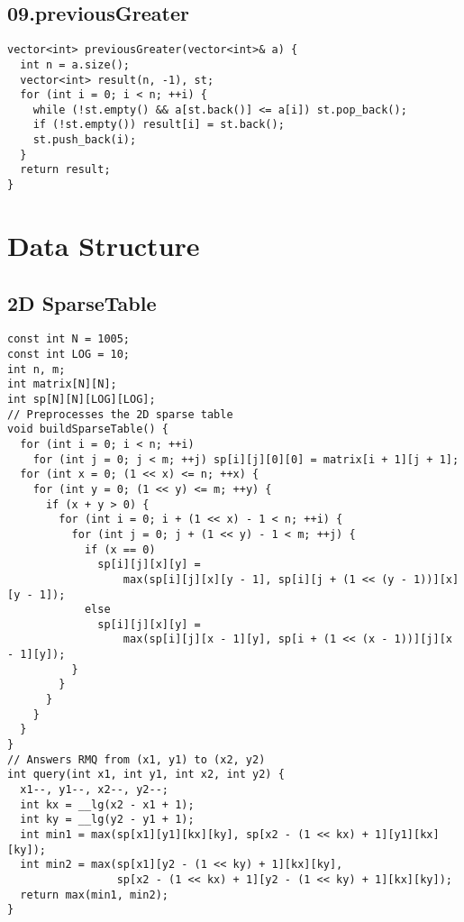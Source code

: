 \documentclass[twoside]{article}
\begin{document}
\begin{multicols*}{2}
{
\subsection*{09.previousGreater}
}
\begin{verbatim}
vector<int> previousGreater(vector<int>& a) {
  int n = a.size();
  vector<int> result(n, -1), st;
  for (int i = 0; i < n; ++i) {
    while (!st.empty() && a[st.back()] <= a[i]) st.pop_back();
    if (!st.empty()) result[i] = st.back();
    st.push_back(i);
  }
  return result;
}
\end{verbatim}

{
\section*{Data Structure}
}
{
\subsection*{2D SparseTable}
}
\begin{verbatim}
const int N = 1005;
const int LOG = 10;
int n, m;
int matrix[N][N];
int sp[N][N][LOG][LOG];
// Preprocesses the 2D sparse table
void buildSparseTable() {
  for (int i = 0; i < n; ++i)
    for (int j = 0; j < m; ++j) sp[i][j][0][0] = matrix[i + 1][j + 1];
  for (int x = 0; (1 << x) <= n; ++x) {
    for (int y = 0; (1 << y) <= m; ++y) {
      if (x + y > 0) {
        for (int i = 0; i + (1 << x) - 1 < n; ++i) {
          for (int j = 0; j + (1 << y) - 1 < m; ++j) {
            if (x == 0)
              sp[i][j][x][y] =
                  max(sp[i][j][x][y - 1], sp[i][j + (1 << (y - 1))][x][y - 1]);
            else
              sp[i][j][x][y] =
                  max(sp[i][j][x - 1][y], sp[i + (1 << (x - 1))][j][x - 1][y]);
          }
        }
      }
    }
  }
}
// Answers RMQ from (x1, y1) to (x2, y2)
int query(int x1, int y1, int x2, int y2) {
  x1--, y1--, x2--, y2--;
  int kx = __lg(x2 - x1 + 1);
  int ky = __lg(y2 - y1 + 1);
  int min1 = max(sp[x1][y1][kx][ky], sp[x2 - (1 << kx) + 1][y1][kx][ky]);
  int min2 = max(sp[x1][y2 - (1 << ky) + 1][kx][ky],
                 sp[x2 - (1 << kx) + 1][y2 - (1 << ky) + 1][kx][ky]);
  return max(min1, min2);
}


\end{verbatim}
\end{multicols*}
\end{document}
